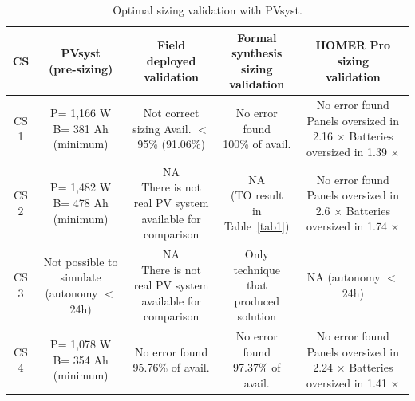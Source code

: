 \documentclass[runningheads]{llncs}
\begin{document}
\begin{table}
\caption{Optimal sizing validation with PVsyst.}
\label{tab2}
\begin{scriptsize}
\begin{tabular}{c|c|c|c|c}
\hline
\hline
CS & \makecell{PVsyst\\(pre-sizing)}& \makecell{Field\\deployed\\validation}& \makecell{Formal synthesis\\sizing\\validation}& \makecell{HOMER Pro\\sizing\\validation}\\
\hline
\hline
CS 1 & \makecell{P= 1,166 W\\B= 381 Ah\\(minimum)} & \makecell{Not correct sizing \\Avail. $<$ 95\%\\(91.06\%)} & \makecell{No error found \\100\% of avail.} & \makecell{No error found\\Panels oversized in 2.16 $\times$\\Batteries oversized in 1.39 $\times$}\\
\hline
CS 2 & \makecell{P= 1,482 W\\B= 478 Ah\\(minimum)} & \makecell{NA\\There is not real PV system\\available for comparison} & \makecell{NA \\(TO result\\in Table~\ref{tab1})} & \makecell{No error found\\Panels oversized in 2.6 $\times$\\Batteries oversized in 1.74 $\times$}\\
\hline
CS 3 & \makecell{Not possible to \\simulate\\(autonomy $<$ 24h)} & \makecell{NA\\There is not real PV system\\available for comparison} & \makecell{Only technique that\\produced solution} & \makecell{NA\\(autonomy $<$ 24h)}\\
\hline
CS 4 & \makecell{P= 1,078 W\\B= 354 Ah\\(minimum)} & \makecell{No error found \\95.76\% of avail.} & \makecell{No error found \\97.37\% of avail.} & \makecell{No error found\\Panels oversized in 2.24 $\times$\\Batteries oversized in 1.41 $\times$}\\

\end{tabular}
\end{scriptsize}
\end{table}
\end{document}
